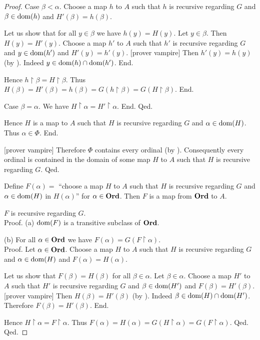 \documentclass{article}
\begin{document}
\begin{forthel}
\begin{proof}
            Case $\beta < \alpha$.
              Choose a map $h$ to $A$ such that $h$ is recursive regarding $G$ and $\beta \in \operatorname{dom}(h)$ and $H'(\beta) = h(\beta)$.

              Let us show that for all $y \in \beta$ we have $h(y) = H(y)$.
                Let $y \in \beta$.
                Then $H(y) = H'(y)$.
                Choose a map $h'$ to $A$ such that $h'$ is recursive regarding $G$ and $y \in \operatorname{dom}(h')$ and $H'(y) = h'(y)$.
                [prover vampire]
                Then $h'(y) = h(y)$ (by ).
                Indeed $y \in \operatorname{dom}(h) \cap \operatorname{dom}(h')$.
              End.

              Hence $h \restriction \beta = H \restriction \beta$.
              Thus $H(\beta)
                = H'(\beta)
                = h(\beta)
                = G(h \restriction \beta)
                = G(H \restriction \beta)$.
            End.

            Case $\beta = \alpha$.
              We have $H \restriction \alpha = H' \restriction \alpha$.
            End.
          Qed.

          Hence $H$ is a map to $A$ such that $H$ is recursive regarding $G$ and $\alpha \in \operatorname{dom}(H)$.
          Thus $\alpha \in \Phi$.
        End.

        [prover vampire]
        Therefore $\Phi$ contains every ordinal (by ).
        Consequently every ordinal is contained in the domain of some map $H$ to $A$ such that $H$ is recursive regarding $G$.
      Qed.

      Define $F(\alpha) =$ ``choose a map $H$ to $A$ such that $H$ is recursive regarding $G$ and $\alpha \in \operatorname{dom}(H)$ in $H(\alpha)$'' for $\alpha \in \textbf{Ord}$.
      Then $F$ is a map from $\textbf{Ord}$ to $A$.

      $F$ is recursive regarding $G$. \\
      Proof.
        (a) $\operatorname{dom}(F)$ is a transitive subclass of $\textbf{Ord}$.

        (b) For all $\alpha \in \textbf{Ord}$ we have $F(\alpha) = G(F \restriction \alpha)$. \\
        Proof.
          Let $\alpha \in \textbf{Ord}$.
          Choose a map $H$ to $A$ such that $H$ is recursive regarding $G$ and $\alpha \in \operatorname{dom}(H)$ and $F(\alpha) = H(\alpha)$.

          Let us show that $F(\beta) = H(\beta)$ for all $\beta \in \alpha$.
            Let $\beta \in \alpha$.
            Choose a map $H'$ to $A$ such that $H'$ is recursive regarding $G$ and $\beta \in \operatorname{dom}(H')$ and $F(\beta) = H'(\beta)$.
            [prover vampire]
            Then $H(\beta) = H'(\beta)$ (by ).
            Indeed $\beta \in \operatorname{dom}(H) \cap \operatorname{dom}(H')$.
            Therefore $F(\beta) = H'(\beta)$.
          End.

          Hence $H \restriction \alpha = F \restriction \alpha$.
          Thus $F(\alpha)
            = H(\alpha)
            = G(H \restriction \alpha)
            = G(F \restriction \alpha)$.
        Qed.
      Qed.
    \end{proof}
  \end{forthel}
\end{document}
